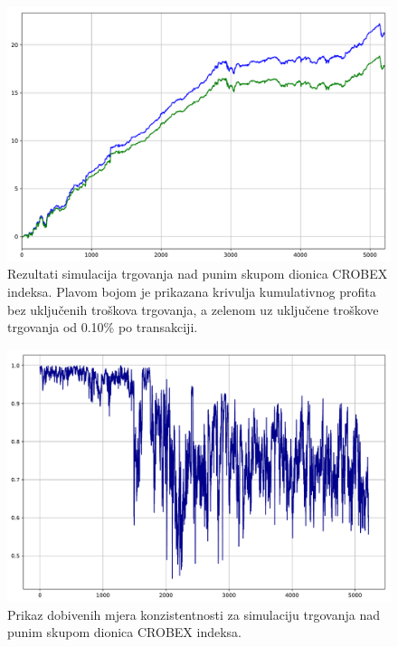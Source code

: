 \documentclass[lmodern, utf8, diplomski, numeric]{fer}
\begin{document}
  \begin{figure}[p]
    \centering
    \includegraphics[width=\linewidth]{graphics/results2.pdf}
    \caption{Rezultati simulacija trgovanja nad punim skupom dionica CROBEX indeksa. Plavom bojom je prikazana krivulja kumulativnog profita bez uključenih troškova trgovanja, a zelenom uz uključene troškove trgovanja od 0.10\% po transakciji.}
    \label{fig:results3}
  \end{figure}
  
  \begin{figure}[p]
    \centering
    \includegraphics[width=\linewidth]{graphics/crobex-cons.pdf}
    \caption{Prikaz dobivenih mjera konzistentnosti za simulaciju trgovanja nad punim skupom dionica CROBEX indeksa.}
    \label{fig:sharpe3}
  \end{figure}
  \pagebreak
  
\end{document}
